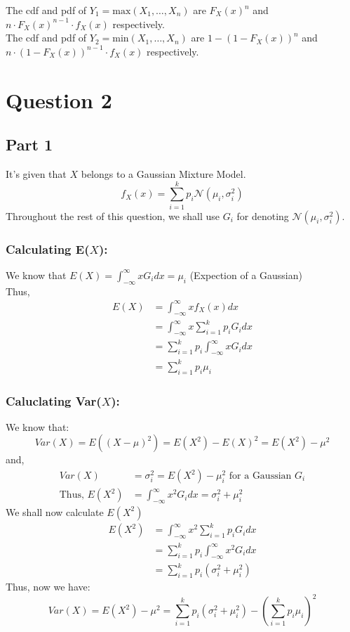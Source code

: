 \documentclass[11pt, fleqn]{article}
\begin{document}
The cdf and pdf of $Y_1 = \text{max}(X_1, \dots, X_n)$ are $F_X(x)^n$ and $n \cdot F_X(x)^{n-1} \cdot f_X(x)$ respectively. \\
The cdf and pdf of $Y_2 = \text{min}(X_1, \dots, X_n)$ are $1 - (1 - F_X(x))^n$ and $n \cdot (1 - F_X(x))^{n-1} \cdot f_X(x)$ respectively.







\newpage
\section*{Question 2}
\setcounter{equation}{0}

\subsection*{Part 1}
It's given that $X$ belongs to a Gaussian Mixture Model.\\
$$ f_X(x) = \sum_{i=1}^{k}p_i \mathcal{N}(\mu_i, \sigma_i^2) $$
Throughout the rest of this question, we shall use $G_i$ for denoting $\mathcal{N}(\mu_i, \sigma_i^2) $.
\subsubsection*{Calculating E($X$):}
We know that $E(X) = \int_{-\infty}^{\infty} x G_i dx = \mu_i$ (Expection of a Gaussian)\\
Thus,
$$
\begin{aligned}
    E(X) &= \int_{-\infty}^{\infty}x f_X(x) dx\\
    &= \int_{-\infty}^{\infty} x \sum_{i=1}^{k}p_i G_i dx\\
    &= \sum_{i=1}^{k}p_i \int_{-\infty}^{\infty} x G_i dx\\
    &= \boxed{ \sum_{i=1}^{k}p_i \mu_i }
\end{aligned}
$$
\subsubsection*{Caluclating Var($X$):}
We know that:
$$ 
Var(X) = E((X-\mu)^2) = E(X^2) - E(X)^2 = E(X^2) - \mu^2 $$
and,
$$
\begin{aligned}
Var(X) &= \sigma_i^2 = E(X^2)-\mu_i^2 \text{ for a Gaussian } G_i \\
\text{Thus, } E(X^2) &= \int_{-\infty}^{\infty} x^2 G_i dx = \sigma_i^2+\mu_i^2
\end{aligned}
$$
We shall now calculate $E(X^2)$
$$
\begin{aligned}
    E(X^2) &= \int_{-\infty}^{\infty} x^2 \sum_{i=1}^{k}p_i G_i dx\\
    &= \sum_{i=1}^{k}p_i \int_{-\infty}^{\infty} x^2 G_i dx\\
    &= \sum_{i=1}^{k}p_i (\sigma_i^2 + \mu_i^2)
\end{aligned}
$$
Thus, now we have:
$$
Var(X) = E(X^2)-\mu^2 = \boxed{ \sum_{i=1}^{k}p_i (\sigma_i^2 + \mu_i^2) - (\sum_{i=1}^{k}p_i \mu_i)^2 }
$$
\\
\end{document}
